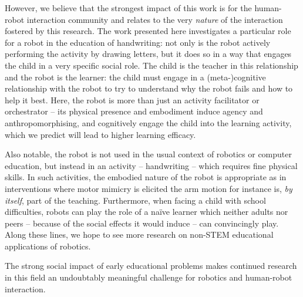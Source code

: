 \documentclass{sig-alternate}
\begin{document}
However, we believe that the strongest impact of this work is for the human-robot
interaction community and relates to the very \emph{nature} of the interaction
fostered by this research. The work presented here investigates a particular
role for a robot in the education of handwriting: not only is the robot actively
performing the activity by drawing letters, but it does so in a way that engages
the child in a very specific social role. The child is the teacher in this relationship and the robot is
the learner: the child must engage in a (meta-)cognitive relationship with the robot
to try to understand why the robot fails and how to help it best.  Here, the
robot is more than just an activity facilitator or orchestrator -- its physical presence
and embodiment induce agency and anthropomorphising, and cognitively engage the
child into the learning activity, which we predict will lead to higher learning
efficacy.

Also notable, the robot is not used in the usual context of robotics or computer
education, but instead in an activity -- handwriting -- which requires fine
physical skills. In such activities, the embodied nature of the robot is appropriate as in interventions where motor mimicry is elicited \cite{Berninger1997} the arm motion for instance is, \emph{by
itself}, part of the teaching. Furthermore, when facing a child with school 
difficulties, robots can play the role of a na\"ive learner which neither adults 
nor peers -- because of the social effects it would induce -- can convincingly 
play. Along these lines, we hope to see more research
on non-STEM educational applications of robotics.


The strong social impact of early educational problems makes continued research in this field
an undoubtably meaningful challenge for robotics and human-robot interaction.

\end{document}
